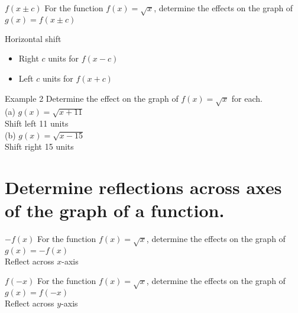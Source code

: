 \documentclass[t,usenames,dvipsnames]{beamer}
\begin{document}
\begin{frame}{$f(x \pm c)$}
For the function $f(x) = \sqrt{x}$, determine the effects on the graph of $g(x) = f(x \pm c)$ \newline\\  \pause

Horizontal shift    \newline\\  \pause
\begin{itemize}
    \item<+-> Right $c$ units for $f(x-c)$ \newline\\
    \item<+-> Left $c$ units for $f(x+c)$ \newline\\
\end{itemize}

\end{frame}

\begin{frame}{Example 2}
Determine the effect on the graph of $f(x) = \sqrt{x}$ for each.    \newline\\  \pause
(a) \quad $g(x) = \sqrt{x + 11}$ \newline\\ \pause
Shift left 11 units \newline\\  \pause
(b) \quad $g(x) = \sqrt{x - 15}$ \newline\\ \pause
Shift right 15 units
\end{frame}


\section{Determine reflections across axes of the graph of a function.}

\begin{frame}{$-f(x)$}
    For the function $f(x) = \sqrt{x}$, determine the effects on the graph of $g(x) = -f(x)$  \newline\\  \pause
    Reflect across $x$-axis
\end{frame}

\begin{frame}{$f(-x)$}
    For the function $f(x) = \sqrt{x}$, determine the effects on the graph of $g(x) = f(-x)$  \newline\\  \pause
    Reflect across $y$-axis
\end{frame}
\end{document}
